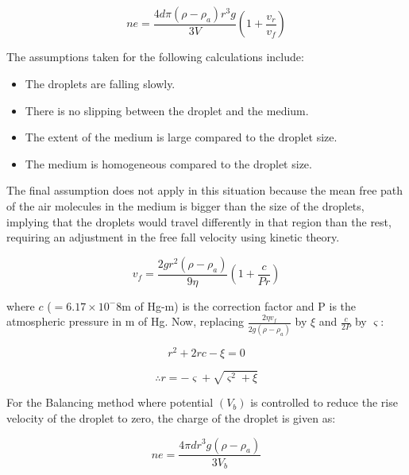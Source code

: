 	\begin{equation}
		ne = \frac{4d\pi(\rho-\rho_a)r^3g}{3V}\left(1+\frac{v_r}{v_f}\right)
		\label{eqn:1}
	\end{equation}

	The assumptions taken for the following calculations include:
	
	\begin{itemize}
		\item The droplets are falling slowly.
		\item There is no slipping between the droplet and the medium.
		\item The extent of the medium is large compared to the droplet size.
		\item The medium is homogeneous compared to the droplet size.
	\end{itemize}

	The final assumption does not apply in this situation because the mean free path of the air molecules in the medium is bigger than the size of the droplets, implying that the droplets would travel differently in that region than the rest, requiring an adjustment in the free fall velocity using kinetic theory.

	$$v_f = \frac{2gr^2(\rho-\rho_a)}{9\eta} \left(1+\frac{c}{Pr}\right)$$

	where $c$ ($=6.17\times10^-8$m of Hg-m) is the correction factor and P is the atmospheric pressure in m of Hg. Now, replacing $\frac{2\eta v_f}{2g(\rho-\rho_a)}$ by $\xi$ and $\frac{c}{2P}$ by $\varsigma$:

	$$r^2+2rc-\xi = 0$$

	\begin{equation}
		\therefore r = -\varsigma + \sqrt{\varsigma^2+\xi}
		\label{eqn:2}
	\end{equation}

	For the Balancing method where potential $(V_b)$ is controlled to reduce the rise velocity of the droplet to zero, the charge of the droplet is given as:


	\begin{equation}
		ne = \frac{4\pi dr^3g(\rho-\rho_a)}{3V_b}
		\label{eqn:3}
	\end{equation}